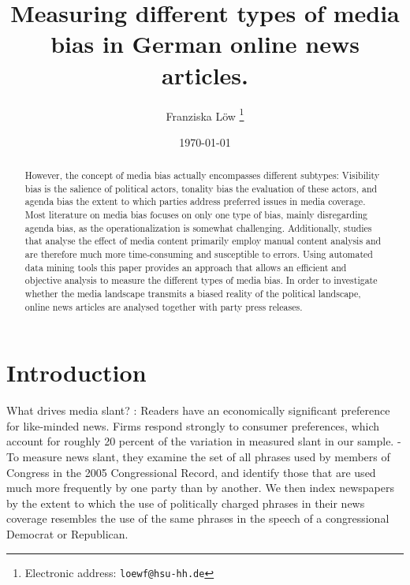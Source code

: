 \documentclass[12pt,a4paper,notitlepage]{article}
\title{Measuring different types of media bias in German online news articles.}
\date{\today}
\author{Franziska Löw
  \thanks{Electronic address: \texttt{loewf@hsu-hh.de}}}
\affil{Department of Industrial Economics,\\ Helmut Schmidt University,\\ Hamburg, Germany}
\begin{document}
\begin{titlepage}
	\maketitle
	\begin{abstract}
	However, the concept of media bias actually encompasses different subtypes: Visibility bias is the salience of political actors, tonality bias the evaluation of these actors, and agenda bias the extent to which parties address preferred issues in media coverage. Most literature on media bias focuses on only one type of bias, mainly disregarding agenda bias, as the operationalization is somewhat challenging. Additionally, studies that analyse the effect of media content primarily employ manual content analysis and are therefore much more time-consuming and susceptible to errors. Using automated data mining tools this paper provides an approach that allows an efficient and objective analysis to measure the different types of media bias. In order to investigate whether the media landscape transmits a biased reality of the political landscape, online news articles are analysed together with party press releases.
	\end{abstract}

\end{titlepage}

\tableofcontents

\pagebreak


\section{Introduction}

What drives media slant?
\citet{gentzkow_what_2010} : Readers have an economically significant preference for like-minded news. Firms respond strongly to consumer preferences, which account for roughly 20 percent of the variation in measured slant in our sample.
- To measure news slant, they examine the set of all phrases used by members of Congress in the 2005 Congressional Record, and identify those that are used much more frequently by one party than by another. We then index newspapers by the extent to which the use of politically charged phrases in their news coverage resembles the use of the same phrases in the speech of a congressional Democrat or Republican.
\end{document}
